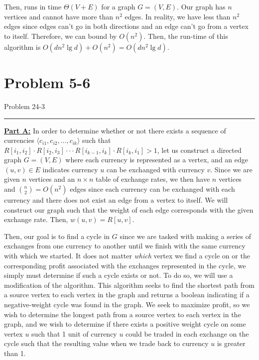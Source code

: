 \documentclass[11pt]{article}
\def\separateline{\medskip\hrule\medskip}
\begin{document}
Then,  runs in time $\Theta(V+E)$ for a graph $G=(V,E)$. Our graph has $n$ vertices and cannot have more than $n^2$ edges. In reality, we have less than $n^2$ edges since edges can't go in both directions and an edge can't go from a vertex to itself. Therefore, we can bound  by $O(n^2)$. Then, the run-time of this algorithm is $O(dn^2\lg{d}) + O(n^2) = O(dn^2\lg{d})$.

\newpage

\section{Problem 5-6}
Problem 24-3
\separateline

\textbf{\underline{Part A:}} In order to determine whether or not there exists a sequence of currencies $\langle c_{i1}, c_{i2}, ..., c_{ik} \rangle$ such that $R[i_1,i_2] \cdot R[i_2,i_3] \cdot \cdot \cdot R[i_{k-1},i_k] \cdot R[i_k,i_1] > 1$, let us construct a directed graph $G = (V,E)$ where each currency is represented as a vertex, and an edge $(u,v) \in E$ indicates currency $u$ can be exchanged with currency $v$. Since we are given $n$ vertices and an $n \times n$ table of exchange rates, we then have $n$ vertices and ${n \choose 2} = O(n^2)$ edges since each currency can be exchanged with each currency and there does not exist an edge from a vertex to itself. We will construct our graph such that the weight of each edge corresponds with the given exchange rate. Then, $w(u,v) = R[u,v]$.

Then, our goal is to find a cycle in $G$ since we are tasked with making a series of exchanges from one currency to another until we finish with the same currency with which we started. It does not matter \textit{which} vertex we find a cycle on or the corresponding profit associated with the exchanges represented in the cycle, we simply must determine if such a cycle exists or not. To do so, we will use a modification of the  algorithm. This algorithm seeks to find the shortest path from a source vertex to each vertex in the graph and returns a boolean indicating if a negative-weight cycle was found in the graph. We seek to maximize profit, so we wish to determine the longest path from a source vertex to each vertex in the graph, and we wish to determine if there exists a positive weight cycle on some vertex $u$ such that 1 unit of currency $u$ could be traded in each exchange on the cycle such that the resulting value when we trade back to currency $u$ is greater than 1.
\end{document}
